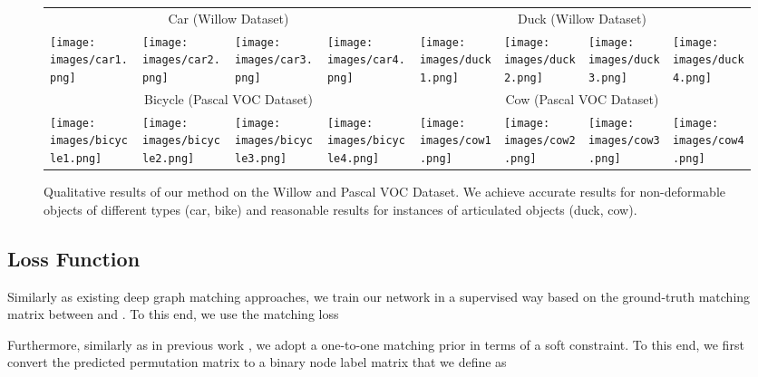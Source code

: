 \begin{figure*}[t]
  \centering
  \footnotesize
  \newcommand{\mywidth}{0.12\textwidth} 
  \newcolumntype{X}{ >{\centering\arraybackslash} m{\mywidth} }
  \setlength\tabcolsep{0.5pt} 
  \def\arraystretch{1.0} 
  \begin{tabular}[t]{XXXXXXXX}
  \multicolumn{4}{c}{Car (Willow Dataset)} & 
  \multicolumn{4}{c}{Duck (Willow Dataset)}\\
  \texttt{[image: images/car1.png]} &
  \texttt{[image: images/car2.png]} &
  \texttt{[image: images/car3.png]} &
  \texttt{[image: images/car4.png]} &
  \texttt{[image: images/duck1.png]} &
  \texttt{[image: images/duck2.png]} &
  \texttt{[image: images/duck3.png]} &
  \texttt{[image: images/duck4.png]} \\
  \multicolumn{4}{c}{Bicycle (Pascal VOC Dataset)} & 
  \multicolumn{4}{c}{Cow (Pascal VOC Dataset)} \\
  \texttt{[image: images/bicycle1.png]} &
  \texttt{[image: images/bicycle2.png]} &
  \texttt{[image: images/bicycle3.png]} &
  \texttt{[image: images/bicycle4.png]} &
  \texttt{[image: images/cow1.png]} &
  \texttt{[image: images/cow2.png]} &
  \texttt{[image: images/cow3.png]} &
  \texttt{[image: images/cow4.png]}
  \end{tabular} 
  \caption{Qualitative results of our method on the Willow and Pascal VOC Dataset. We achieve accurate results for non-deformable objects of different types (car, bike) and reasonable results for instances of articulated objects (duck, cow).}
  \label{fig:qualitative_res}
\end{figure*}
 

\subsection{Loss Function}
Similarly as existing deep graph matching approaches, we train
our network in a supervised way based on the ground-truth matching matrix  between  and . To this end, we use the matching loss

Furthermore, 
similarly as in previous work \cite{wang2018abpf, wang2020combinatorial}, we adopt a one-to-one matching prior in terms of a soft constraint.
To this end, we first convert the predicted permutation matrix  to a binary node label matrix  that we define as 

